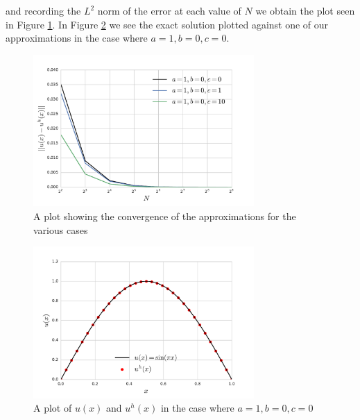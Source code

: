 and recording the $L^2$ norm of the error at each value of $N$ we obtain the
plot seen in Figure \ref{fig:oned-deterministic-error}. In Figure
\ref{fig:oned-deterministic-exact-v-approx} we see the exact solution plotted
against one of our approximations in the case where $a = 1, b = 0, c = 0$.

%    

\begin{figure}
    \centering
    \includegraphics[width=0.75\textwidth]{img/one-d-deterministic-error.pdf}
    \caption{A plot showing the convergence of the approximations for the
             various cases}
    \label{fig:oned-deterministic-error}
\end{figure}

\begin{figure}
    \centering
    \includegraphics[width=0.75\textwidth]{img/oned-deterministic-plot.pdf}
    \caption{A plot of $u(x)$ and $u^h(x)$ in the case where $a=1, b=0, c=0$}
    \label{fig:oned-deterministic-exact-v-approx}
\end{figure}
